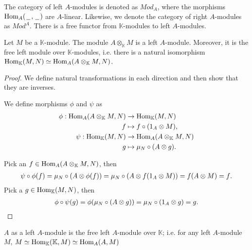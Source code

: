 \documentclass[../thesis.tex]{subfiles}
\begin{document}
                The category of left $A$-modules is denoted as $Mod_A$, where the morphisms $\tt{Hom}_A(\argument,\argument)$ are $A$-linear. Likewise, we denote the category of right $A$-modules as $Mod^A$. There is a free functor from $\mathbb{K}$-modules to left $A$-modules.

                \begin{proposition}\label{prop: free-mod}
                    Let $M$ be a $\mathbb{K}$-module. The module $A\otimes_{\mathbb{K}}M$ is a left $A$-module. Moreover, it is the free left module over $\mathbb{K}$-modules, i.e. there is a natural isomorphism $\tt{Hom}_{\mathbb{K}}(M,N)\simeq \tt{Hom}_{A}(A\otimes_{\mathbb{K}}M,N)$.
                \end{proposition}

                \begin{proof}
                    We define natural transformations in each direction and then show that they are inverses.

                    We define morphisms $\phi$ and $\psi$ as
                    \begin{align*}
                        \phi : \tt{Hom}_A(A\otimes_\mathbb{K}M, N) & \rightarrow \tt{Hom}_\mathbb{K}(M,N) \\
                        f & \mapsto f \circ (1_A \otimes M)\tt{,} \\
                        \psi : \tt{Hom}_\mathbb{K}(M, N) & \rightarrow \tt{Hom}_A(A\otimes_\mathbb{K}M, N) \\
                        g & \mapsto \mu_N \circ (A \otimes g)\tt{.}
                    \end{align*}

                    Pick an $f \in \tt{Hom}_A(A\otimes_\mathbb{K}M, N)$, then
                    \begin{align*}
                            \psi\circ\phi (f) = \mu_N \circ (A \otimes \phi (f)) = \mu_N \circ (A \otimes f (1_A \otimes M)) = f (A \otimes M) = f\tt{.}
                    \end{align*}
                    Pick a $g \in \tt{Hom}_\mathbb{K}(M,N)$, then
                    \begin{align*}
                        \phi\circ\psi (g) = \phi (\mu_N \circ (A \otimes g)) = \mu_N \circ (1_A \otimes g) = g\tt{.}
                    \end{align*}
                \end{proof}

                \begin{corollary}
                    $A$ as a left $A$-module is the free left $A$-module over $\mathbb{K}$; i.e. for any left $A$-module $M$, $M \simeq \tt{Hom}_\mathbb{K}(\mathbb{K}, M) \simeq \tt{Hom}_A(A,M)$
                \end{corollary}
            
\end{document}
